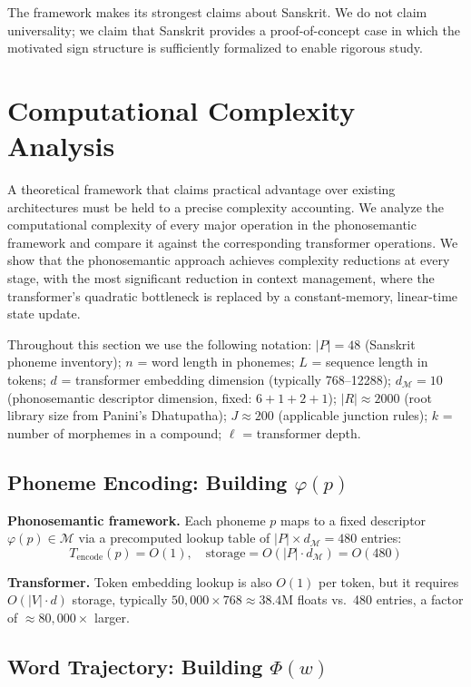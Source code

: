\documentclass[12pt]{article}
\begin{document}
The framework makes its strongest claims about Sanskrit. We do not claim universality; we claim that Sanskrit provides a proof-of-concept case in which the motivated sign structure is sufficiently formalized to enable rigorous study.


\section{Computational Complexity Analysis}
\label{sec:complexity}

A theoretical framework that claims practical advantage over existing architectures must be held to a precise complexity accounting. We analyze the computational complexity of every major operation in the phonosemantic framework and compare it against the corresponding transformer operations. We show that the phonosemantic approach achieves complexity reductions at every stage, with the most significant reduction in context management, where the transformer's quadratic bottleneck is replaced by a constant-memory, linear-time state update.

Throughout this section we use the following notation: $|P| = 48$ (Sanskrit phoneme inventory); $n$ = word length in phonemes; $L$ = sequence length in tokens; $d$ = transformer embedding dimension (typically 768--12288); $d_\mathcal{M} = 10$ (phonosemantic descriptor dimension, fixed: $6 + 1 + 2 + 1$); $|R| \approx 2000$ (root library size from Panini's Dhatupatha); $J \approx 200$ (applicable junction rules); $k$ = number of morphemes in a compound; $\ell$ = transformer depth.

\subsection{Phoneme Encoding: Building $\varphi(p)$}

\textbf{Phonosemantic framework.}
Each phoneme $p$ maps to a fixed descriptor $\varphi(p) \in \mathcal{M}$ via a precomputed lookup table of $|P| \times d_\mathcal{M} = 480$ entries:
\[
T_\text{encode}(p) = O(1), \quad \text{storage} = O(|P| \cdot d_\mathcal{M}) = O(480)
\]

\textbf{Transformer.}
Token embedding lookup is also $O(1)$ per token, but it requires $O(|V| \cdot d)$ storage, typically $50{,}000 \times 768 \approx 38.4\text{M}$ floats vs.\ 480 entries, a factor of $\approx 80{,}000\times$ larger.

\subsection{Word Trajectory: Building $\Phi(w)$}
\end{document}
